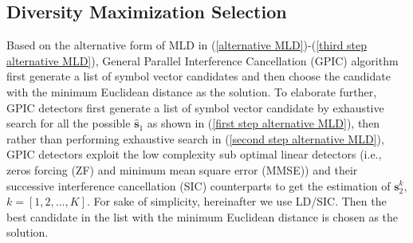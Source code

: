 \documentclass[12pt, draftclsnofoot, onecolumn]{IEEEtran}
\begin{document}
\subsection{Diversity Maximization Selection}\label{DMS analysis}
Based on the alternative form of MLD in (\ref{alternative MLD})-(\ref{third step alternative MLD}), General Parallel Interference Cancellation (GPIC) algorithm first generate a list of symbol vector candidates and then choose the candidate with the minimum Euclidean distance as the solution. To elaborate further, GPIC detectors first generate a list of symbol vector candidate by exhaustive search for all the possible $\hat{\mathbf{s}}_{1}$ as shown in (\ref{first step alternative MLD}), then rather than performing exhaustive search in (\ref{second step alternative MLD}), GPIC detectors exploit the low complexity sub optimal linear detectors (i.e., zeros forcing (ZF) and minimum mean square error (MMSE)) and their successive interference cancellation (SIC) counterparts to get the estimation of $\mathbf{s}^{k}_{2}$, $k=[1,2,\ldots, K]$. For sake of simplicity, hereinafter we use LD/SIC. Then the best candidate in the list with the minimum Euclidean distance is chosen as the solution. 
\end{document}
